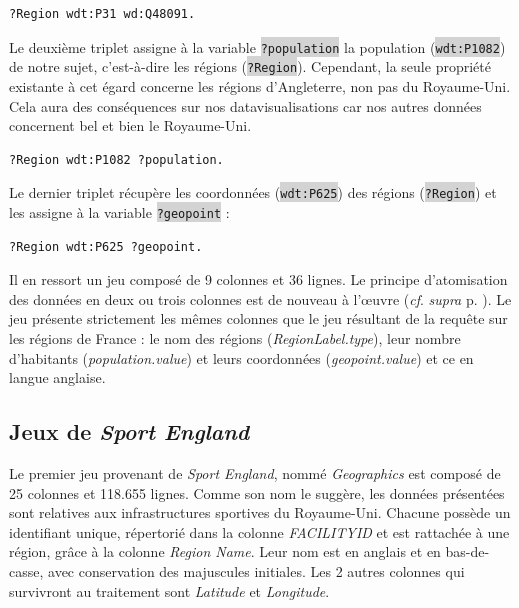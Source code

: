 \documentclass[hidelinks, 12pt]{report}
\newcommand{\code}[1]{\colorbox{LightGray}{\texttt{#1}}}
\begin{document}
\begin{lstlisting}[language=SPARQL]
	?Region wdt:P31 wd:Q48091.
\end{lstlisting}

Le deuxième triplet assigne à la variable \code{?population} la population (\code{wdt:P1082}) de notre sujet, c'est-à-dire les régions (\code{?Region}). Cependant, la seule propriété existante à cet égard concerne les régions d'Angleterre, non pas du Royaume-Uni. Cela aura des conséquences sur nos datavisualisations car nos autres données concernent bel et bien le Royaume-Uni.

\begin{lstlisting}[language=SPARQL]
	?Region wdt:P1082 ?population.
\end{lstlisting}

Le dernier triplet récupère les coordonnées (\code{wdt:P625}) des régions (\code{?Region}) et les assigne à la variable \code{?geopoint} :

\begin{lstlisting}[language=SPARQL]
	?Region wdt:P625 ?geopoint.
\end{lstlisting}

Il en ressort un jeu composé de 9 colonnes et 36 lignes. Le principe d'atomisation des données en deux ou trois colonnes est de nouveau à l'œuvre (\textit{cf}. \textit{supra} p. \pageref{query1tab}). Le jeu présente strictement les mêmes colonnes que le jeu résultant de la requête sur les régions de France : le nom des régions (\textit{RegionLabel.type}), leur nombre d'habitants (\textit{population.value}) et leurs coordonnées (\textit{geopoint.value}) et ce en langue anglaise.





%





\subsection{Jeux de \textit{Sport England}}

Le premier jeu provenant de \textit{Sport England}, nommé \textit{Geographics} est composé de 25 colonnes et 118.655 lignes. Comme son nom le suggère, les données présentées sont relatives aux infrastructures sportives du Royaume-Uni. Chacune possède un identifiant unique, répertorié dans la colonne \textit{FACILITYID} et est rattachée à une région, grâce à la colonne \textit{Region Name}. Leur nom est en anglais et en bas-de-casse, avec conservation des majuscules initiales. Les 2 autres colonnes qui survivront au traitement sont \textit{Latitude} et \textit{Longitude}.
\end{document}

